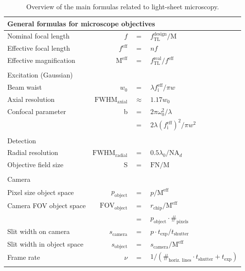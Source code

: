 \documentclass[12pt]{spieman}  %
\begin{document}
\begin{spacing}{2}
\begin{table}[t!]
	\centering
		\caption[Main formulas]{Overview of the main formulas related to light-sheet microscopy. \label{tab:resolution}}
		\begin{tabular}{lrcl}
		\\
		\multicolumn{4}{l}{General formulas for microscope objectives}\\\hline\hline 
		Nominal focal length							& $f$ 													& $=$					& $f_{\text{TL}}^{\text{design}}/\text{M}$				\\	
		Effective focal length						& $f^{\text{eff}}$							& $=$					& $nf$													\\
		Effective magnification						& $\text{M}^{\text{eff}}$				& $=$					& $f_{\text{TL}}^{\text{real}}/f^{\text{eff}}$			\\\\
		\multicolumn{4}{l}{Excitation (Gaussian)}\\\hline\hline	
		Beam waist												&$w_0$													& $=$ 				& $ \lambda f_{\text{i}}^{\text{eff}} / \pi w$				\\
		Axial resolution									&$\text{FWHM}_{\text{axial}}$		& $\approx$   & $ 1.17 w_0 $											\\
		Confocal parameter								& b															& $=$  				& $2 \pi \omega_0^2 / \lambda$							\\
																			&  															& $=$   			& $2 \lambda {(f_{\text{i}}^{\text{eff}})}^2 / \pi w^2 $	\\\\
		\multicolumn{4}{l}{Detection}\\\hline\hline  
		Radial resolution									&$\text{FWHM}_{\text{radial}}$	& $=$					& $0.5 \lambda_0 / \text{NA}_{d}$						\\
		Objective field size							& S															& $=$					& $\text{FN}/{\text{M}}$								\\\\
		\multicolumn{4}{l}{Camera}\\\hline\hline  
		Pixel size object space						& $ p_{\text{object}}$					& $=$					& $p/  \text{M}^{\text{eff}}$							\\
		Camera FOV object space						&$\text{FOV}_{\text{object}}$		& $=$					& $r_{\text{chip}} / \text{M}^{\text{eff}}$				\\
																			&																& $=$					& $p_{\text{object}} \cdot \#_{\text{pixels}}$			\\
		Slit width on camera							& $s_{\text{camera}}$						& $=$					& $ p \cdot t_{\text{exp}} / t_{\text{shutter}} $			\\
		Slit width in object space				& $s_{\text{object}}$						& $=$					& $ s_{\text{camera}}/ \text{M}^{\text{eff}}$			\\
		Frame rate												& $\nu$													& $=$					& $1/(\#_{\text{horiz. lines}} \cdot t_{\text{shutter}} + t_{\text{exp}})$ \\\\

		\end{tabular}
\end{table}

\end{spacing}
\end{document}
